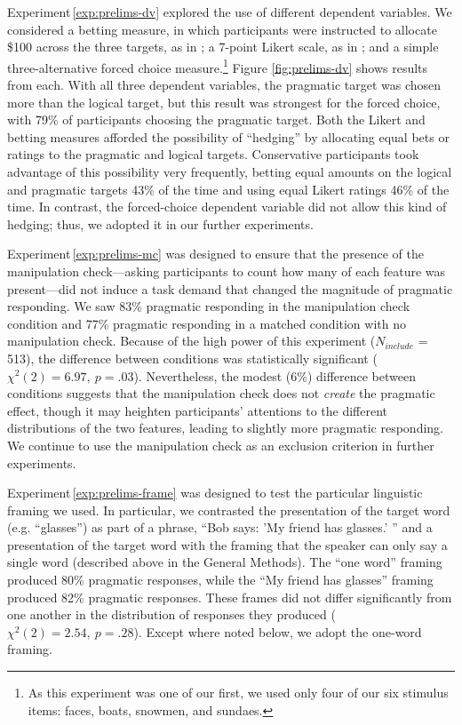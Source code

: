 \documentclass[man,noapacite]{apa2}
\newcounter{Experiment}
\newcommand{\exptref}[1]{Experiment\,\ref{#1}}
\begin{document}
\exptref{exp:prelims-dv} explored the use of different dependent variables. We considered a betting measure, in which participants were instructed to allocate \$100 across the three targets, as in ; a 7-point Likert scale, as in ; and a simple three-alternative forced choice measure.\footnote{As this experiment was one of our first, we used only four of our six stimulus items: faces, boats, snowmen, and sundaes.} Figure \ref{fig:prelims-dv} shows results from each. With all three dependent variables, the pragmatic target was chosen more than the logical target, but this result was strongest for the forced choice, with 79\% of participants choosing the pragmatic target. Both the Likert and betting measures afforded the possibility of ``hedging'' by allocating equal bets or ratings to the pragmatic and logical targets. Conservative participants took advantage of this possibility very frequently, betting equal amounts on the logical and pragmatic targets 43\% of the time and using equal Likert ratings 46\% of the time. In contrast, the forced-choice dependent variable did not allow this kind of hedging; thus, we adopted it in our further experiments.

\exptref{exp:prelims-mc} was designed to ensure that the presence of the manipulation check---asking participants to count how many of each feature was present---did not induce a task demand that changed the magnitude of pragmatic responding. We saw 83\% pragmatic responding in the manipulation check condition and 77\% pragmatic responding in a matched condition with no manipulation check. Because of the high power of this experiment ($N_{include}$ = 513), the difference between conditions was statistically significant ($\chi^2(2) = 6.97,~p = .03$). Nevertheless, the modest (6\%) difference between conditions suggests that the manipulation check does not \emph{create} the pragmatic effect, though it may heighten participants' attentions to the different distributions of the two features, leading to slightly more pragmatic responding. We continue to use the manipulation check as an exclusion criterion in further experiments.

\exptref{exp:prelims-frame} was designed to test the particular linguistic framing we used. In particular, we contrasted the presentation of the target word (e.g. ``glasses'') as part of a phrase, ``Bob says: 'My friend has glasses.' '' and a presentation of the target word with the framing that the speaker can only say a single word (described above in the General Methods). The ``one word'' framing produced 80\% pragmatic responses, while the ``My friend has glasses'' framing produced 82\% pragmatic responses. These frames did not differ significantly from one another in the distribution of responses they produced ($\chi^2(2) = 2.54,~p = .28$). Except where noted below, we adopt the one-word framing.
\end{document}
